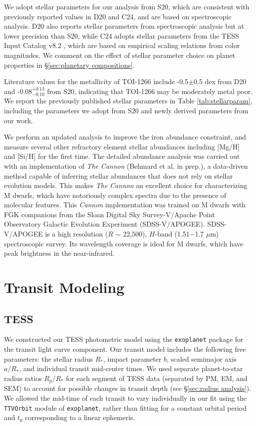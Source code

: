 \documentclass[twocolumn]{aastex631}
\begin{document}
We adopt stellar parameters for our analysis from S20, which are consistent with previously reported values in  D20 and C24, and are based on spectroscopic analysis. D20 also reports stellar parameters from spectroscopic analysis but at lower precision than S20, while C24 adopts stellar parameters from the TESS Input Catalog v8.2 \citep[TIC;][]{Stassun_2019}, which are based on empirical scaling relations from color magnitudes. We comment on the effect of stellar parameter choice on planet properties in \S\ref{sec:planetary compositions}. 

Literature values for the metallicity of TOI-1266 include -0.5$\pm$0.5 dex from D20 and -0.08$^{+0.13}_{-0.10}$ from S20, indicating that TOI-1266 may be moderately metal poor. We report the previously published stellar parameters in Table \ref{tab:stellarparam}, including the parameters we adopt from S20 and newly derived parameters from our work. 

We perform an updated analysis to improve the iron abundance constraint, and measure several other refractory element stellar abundances including [Mg/H] and [Si/H] for the first time. The detailed abundance analysis was carried out with an implementation of \emph{The Cannon} (Behmard et al. in prep.), a data-driven method capable of inferring stellar abundances that does not rely on stellar evolution models. This makes \emph{The Cannon} an excellent choice for characterizing M dwarfs, which have notoriously complex spectra due to the presence of molecular features. This \emph{Cannon} implementation was trained on M dwarfs with FGK companions from the Sloan Digital Sky Survey-V/Apache Point Observatory Galactic Evolution Experiment (SDSS-V/APOGEE). SDSS-V/APOGEE is a high resolution ($R$ $\sim$ 22,500), $H$-band (1.51$-$1.7 $\mu$m) spectroscopic survey. Its wavelength coverage is ideal for M dwarfs, which have peak brightness in the near-infrared.

\section{Transit Modeling} \label{sec:transit analysis}

\subsection{TESS} \label{sec:TESS modeling}

We constructed our TESS photometric model using the \texttt{exoplanet} package \citep{exoplanet:joss} for the transit light curve component. Our transit model includes the following free parameters: the stellar radius $R_*$, impact parameter $b$, scaled semimajor axis $a/R_*$, and individual transit mid-center times. We used separate planet-to-star radius ratios $R_p$/$R_*$ for each segment of TESS data (separated by PM, EM, and SEM) to account for possible changes in transit depth (see \S\ref{sec:radius analysis}). We allowed the mid-time of each transit to vary individually in our fit using the \texttt{TTVOrbit} module of \texttt{exoplanet}, rather than fitting for a constant orbital period and $t_0$ corresponding to a linear ephemeris. 
\end{document}
